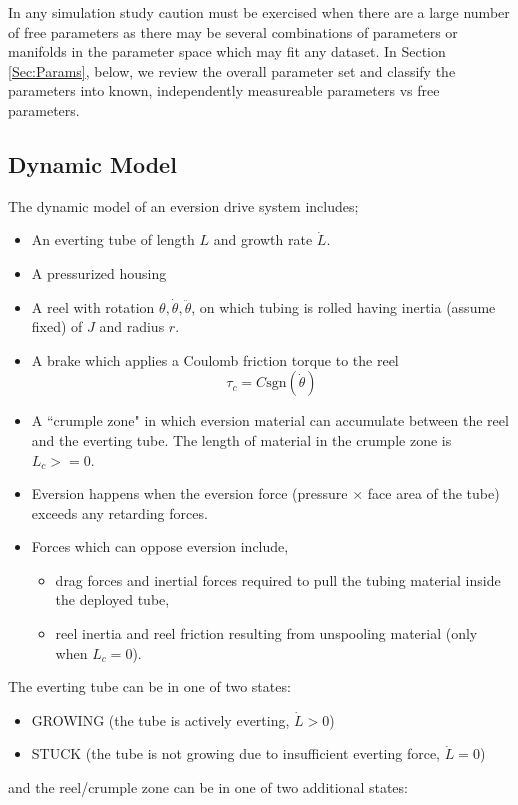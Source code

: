\documentclass[letterpaper]{article}
\begin{document}
In any simulation study caution must be exercised when there are a large number of free parameters
as there may be several combinations of parameters or manifolds in the parameter space which
may fit any dataset.   In Section \ref{Sec:Params}, below, we review the overall parameter set and
classify the parameters into known, independently measureable parameters vs free parameters.


\subsection{Dynamic Model}
The dynamic model of an eversion drive system includes;
\begin{itemize}
  \item An everting tube of length $L$ and growth rate $\dot{L}$.
  \item A pressurized housing
  \item A reel with rotation $\theta, \dot{\theta}, \ddot{\theta}$, on which tubing is rolled having inertia (assume fixed) of
  $J$ and radius $r$.
  \item A brake which applies a Coulomb friction torque to the reel
  \[
    \tau_c = C\mathrm{sgn}(\dot{\theta})
  \]
  \item A ``crumple zone" in which eversion material can accumulate
  between the reel and the everting tube. The length of material in
  the crumple zone is $L_c >= 0$.
  \item Eversion happens when the eversion force (pressure $\times$ face area of the tube) exceeds any retarding forces.
  \item Forces which can oppose eversion include,
  \begin{itemize}
    \item drag forces and inertial forces required to pull the tubing material
    inside the deployed tube,
    \item reel inertia and reel friction resulting from unspooling material (only when $L_c = 0$).
  \end{itemize}
\end{itemize}

\noindent
The everting tube can be in one of two states:
\begin{itemize}
  \item GROWING (the tube is actively everting, $\dot{L}>0$)
  \item STUCK (the tube is not growing due to insufficient everting force, $\dot{L}=0$)
\end{itemize}
and the reel/crumple zone can be in one of two additional states:
\end{document}
